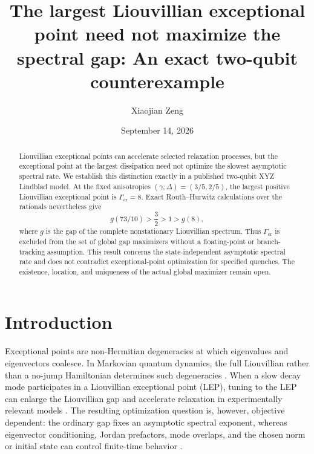 \documentclass[aps,pra,reprint,superscriptaddress,nofootinbib]{revtex4-2}
\begin{document}
\title{The largest Liouvillian exceptional point need not maximize the spectral gap:
An exact two-qubit counterexample}

\author{Xiaojian Zeng}

\date{September 14, 2026}

\begin{abstract}
Liouvillian exceptional points can accelerate selected relaxation processes, but
the exceptional point at the largest dissipation need not optimize the slowest
asymptotic spectral rate.  We establish this distinction exactly in a published
two-qubit XYZ Lindblad model.  At the fixed anisotropies
$(\gamma,\Delta)=(3/5,2/5)$, the largest positive Liouvillian exceptional point
is $\Gamma_{\mathrm{cr}}=8$.  Exact Routh--Hurwitz calculations over the
rationals nevertheless give
\begin{equation*}
 g(73/10)>\frac32>1>g(8),
\end{equation*}
where $g$ is the gap of the complete nonstationary Liouvillian spectrum.
Thus $\Gamma_{\mathrm{cr}}$ is excluded from the set of global gap maximizers
without a floating-point or branch-tracking assumption.  This result concerns
the state-independent asymptotic spectral rate and does not contradict
exceptional-point optimization for specified quenches.  The existence,
location, and uniqueness of the actual global maximizer remain open.
\end{abstract}

\maketitle

\section{Introduction}

Exceptional points are non-Hermitian degeneracies at which eigenvalues and
eigenvectors coalesce.  In Markovian quantum dynamics, the full Liouvillian
rather than a no-jump Hamiltonian determines such degeneracies
\cite{Minganti2019}.  When a slow decay mode participates in a Liouvillian
exceptional point (LEP), tuning to the LEP can enlarge the Liouvillian gap and
accelerate relaxation in experimentally relevant models \cite{Zhou2023}.
The resulting optimization question is, however, objective dependent: the
ordinary gap fixes an asymptotic spectral exponent, whereas eigenvector
conditioning, Jordan prefactors, mode overlaps, and the chosen norm or initial
state can control finite-time behavior \cite{MoriShirai2023}.
\end{document}
